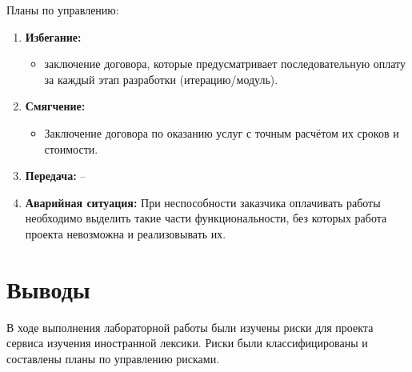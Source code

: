 \documentclass[a4paper,14pt]{extarticle}
\begin{document}
Планы по управлению:
\begin{enumerate}
    \item \textbf{Избегание:}
    \begin{itemize}
        \item заключение договора, которые предусматривает последовательную
              оплату за каждый этап разработки (итерацию/модуль).
    \end{itemize}

    \item \textbf{Смягчение:}
    \begin{itemize}
        \item Заключение договора по оказанию услуг с точным расчётом их сроков
              и стоимости.
    \end{itemize}

    \item \textbf{Передача:} --

    \item \textbf{Аварийная ситуация:} При неспособности заказчика оплачивать
          работы необходимо выделить такие части функциональности, без которых
          работа проекта невозможна и реализовывать их.
\end{enumerate}

\section*{Выводы}
В ходе выполнения лабораторной работы были изучены риски для проекта сервиса
изучения иностранной лексики. Риски были классифицированы и составлены планы по
управлению рисками.
\end{document}
